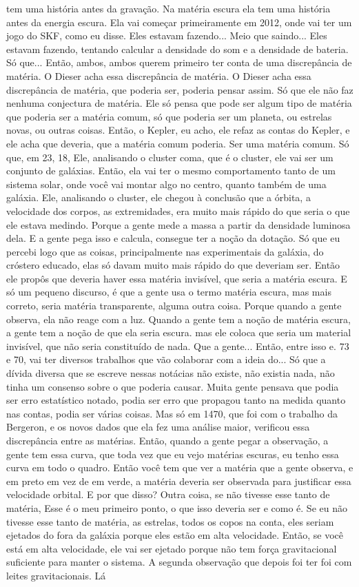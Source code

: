 \documentclass[
	article,			%
	11pt,				%
	twoside,			%
	a4paper,			%
	english,			%
	brazil,				%
	sumario=tradicional
	]{abntex2}
\begin{document}
tem uma história antes da gravação. Na matéria escura ela tem uma história antes da energia escura. Ela vai começar primeiramente em 2012, onde vai ter um jogo do SKF, como eu disse. Eles estavam fazendo... Meio que saindo... Eles estavam fazendo, tentando calcular a densidade do som e a densidade de bateria. Só que... Então, ambos, ambos querem primeiro ter conta de uma discrepância de matéria. O Dieser acha essa discrepância de matéria. O Dieser acha essa discrepância de matéria, que poderia ser, poderia pensar assim. Só que ele não faz nenhuma conjectura de matéria. Ele só pensa que pode ser algum tipo de matéria que poderia ser a matéria comum, só que poderia ser um planeta, ou estrelas novas, ou outras coisas. Então, o Kepler, eu acho, ele refaz as contas do Kepler, e ele acha que deveria, que a matéria comum poderia. Ser uma matéria comum. Só que, em 23, 18, Ele, analisando o cluster coma, que é o cluster, ele vai ser um conjunto de galáxias. Então, ela vai ter o mesmo comportamento tanto de um sistema solar, onde você vai montar algo no centro, quanto também de uma galáxia. Ele, analisando o cluster, ele chegou à conclusão que a órbita, a velocidade dos corpos, as extremidades, era muito mais rápido do que seria o que ele estava medindo. Porque a gente mede a massa a partir da densidade luminosa dela. E a gente pega isso e calcula, consegue ter a noção da dotação. Só que eu percebi logo que as coisas, principalmente nas experimentais da galáxia, do cróstero educado, elas só davam muito mais rápido do que deveriam ser. Então ele propôs que deveria haver essa matéria invisível, que seria a matéria escura. E só um pequeno discurso, é que a gente usa o termo matéria escura, mas mais correto, seria matéria transparente, alguma outra coisa. Porque quando a gente observa, ela não reage com a luz. Quando a gente tem a noção de matéria escura, a gente tem a noção de que ela seria escura. mas ele coloca que seria um material invisível, que não seria constituído de nada. Que a gente... Então, entre isso e. 73 e 70, vai ter diversos trabalhos que vão colaborar com a ideia do... Só que a dívida diversa que se escreve nessas notácias não existe, não existia nada, não tinha um consenso sobre o que poderia causar. Muita gente pensava que podia ser erro estatístico notado, podia ser erro que propagou tanto na medida quanto nas contas, podia ser várias coisas. Mas só em 1470, que foi com o trabalho da Bergeron, e os novos dados que ela fez uma análise maior, verificou essa discrepância entre as matérias. Então, quando a gente pegar a observação, a gente tem essa curva, que toda vez que eu vejo matérias escuras, eu tenho essa curva em todo o quadro. Então você tem que ver a matéria que a gente observa, e em preto em vez de em verde, a matéria deveria ser observada para justificar essa velocidade orbital. E por que disso? Outra coisa, se não tivesse esse tanto de matéria, Esse é o meu primeiro ponto, o que isso deveria ser e como é. Se eu não tivesse esse tanto de matéria, as estrelas, todos os copos na conta, eles seriam ejetados do fora da galáxia porque eles estão em alta velocidade. Então, se você está em alta velocidade, ele vai ser ejetado porque não tem força gravitacional suficiente para manter o sistema. A segunda observação que depois foi ter foi com leites gravitacionais. Lá 
\end{document}
